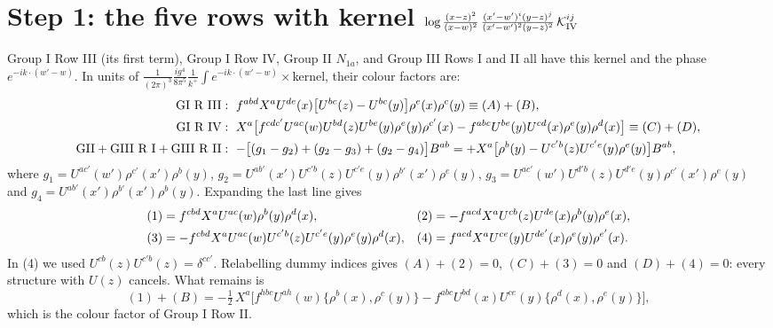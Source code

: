 \documentclass[9pt]{article}
\numberwithin{equation}{section}
\begin{document}
\section{Step 1: the five rows with kernel $\log\frac{(x-z)^{2}}{(x-w)^{2}}\,\frac{(x'-w')^{i}(y-z)^{j}}{(x'-w')^{2}(y-z)^{2}}\,\mathcal K^{ij}_{\rm IV}$}
Group I Row III (its first term), Group I Row IV, Group II $N_{1a}$, and Group III Rows I and II all have this kernel and the phase $e^{-ik\cdot(w'-w)}$. In units of $\frac{1}{(2\pi)^{3}}\frac{ig^{4}}{8\pi^{5}}\frac{1}{k^{+}}\int e^{-ik\cdot(w'-w)}\times$kernel, their colour factors are:
\begin{align}
\text{GI R III}&:\ f^{abd}X^{a}U^{de}(x)\big[U^{bc}(z)-U^{bc}(y)\big]\rho^{e}(x)\rho^{c}(y)\equiv(A)+(B),\notag\\
\text{GI R IV}&:\ X^{a}\big[f^{cdc'}U^{ac}(w)U^{bd}(z)U^{be}(y)\rho^{e}(y)\rho^{c'}(x)-f^{abc}U^{be}(y)U^{cd}(x)\rho^{e}(y)\rho^{d}(x)\big]\equiv(C)+(D),\notag\\
\text{GII}+\text{GIII R I}+\text{GIII R II}&:\ -\big[(g_{1}-g_{2})+(g_{2}-g_{3})+(g_{2}-g_{4})\big]B^{ab}=+X^{a}\big[\rho^{b}(y)-U^{c'b}(z)U^{c'e}(y)\rho^{e}(y)\big]B^{ab},
\end{align}
where $g_{1}=U^{ac'}(w')\rho^{c'}(x')\rho^{b}(y)$, $g_{2}=U^{ab'}(x')U^{c'b}(z)U^{c'e}(y)\rho^{b'}(x')\rho^{e}(y)$, $g_{3}=U^{ac'}(w')U^{d'b}(z)U^{d'e}(y)\rho^{c'}(x')\rho^{e}(y)$ and $g_{4}=U^{ab'}(x')\rho^{b'}(x')\rho^{b}(y)$. Expanding the last line gives
\begin{align}
(1)&=f^{cbd}X^{a}U^{ac}(w)\rho^{b}(y)\rho^{d}(x), & (2)&=-f^{acd}X^{a}U^{cb}(z)U^{de}(x)\rho^{b}(y)\rho^{e}(x),\notag\\
(3)&=-f^{cbd}X^{a}U^{ac}(w)U^{c'b}(z)U^{c'e}(y)\rho^{e}(y)\rho^{d}(x), & (4)&=f^{acd}X^{a}U^{ce}(y)U^{de'}(x)\rho^{e}(y)\rho^{e'}(x).
\end{align}
In (4) we used $U^{cb}(z)U^{c'b}(z)=\delta^{cc'}$. Relabelling dummy indices gives $(A)+(2)=0$, $(C)+(3)=0$ and $(D)+(4)=0$: every structure with $U(z)$ cancels. What remains is
\begin{equation}
(1)+(B)=-\tfrac12\,X^{a}\Big[f^{hbc}U^{ah}(w)\{\rho^{b}(x),\rho^{c}(y)\}-f^{abc}U^{bd}(x)U^{ce}(y)\{\rho^{d}(x),\rho^{e}(y)\}\Big],
\end{equation}
which is the colour factor of Group I Row II.
\end{document}
